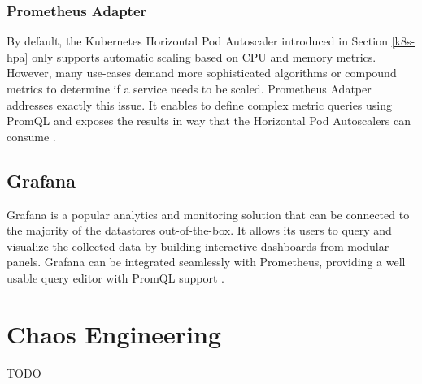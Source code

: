 \subsubsection{Prometheus Adapter}

By default, the Kubernetes Horizontal Pod Autoscaler introduced in Section \ref{k8s-hpa} only supports automatic scaling based on CPU and memory metrics. However, many use-cases demand more sophisticated algorithms or compound metrics to determine if a service needs to be scaled. Prometheus Adatper addresses exactly this issue. It enables to define complex metric queries using PromQL and exposes the results in way that the Horizontal Pod Autoscalers can consume \cite{PrometheusAdapter}.

\subsection{Grafana}

Grafana is a popular analytics and monitoring solution that can be connected to the majority of the datastores out-of-the-box. It allows its users to query and visualize the collected data by building interactive dashboards from modular panels. Grafana can be integrated seamlessly with Prometheus, providing a well usable query editor with PromQL support \cite{Grafana}.


\section{Chaos Engineering}

TODO

